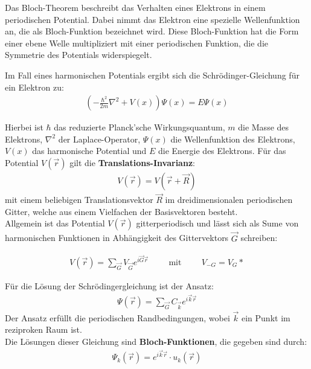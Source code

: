 \label{q:8}

Das Bloch-Theorem beschreibt das Verhalten eines Elektrons in einem periodischen Potential. Dabei nimmt das Elektron eine spezielle Wellenfunktion an, die als Bloch-Funktion bezeichnet wird. Diese Bloch-Funktion hat die Form einer ebene Welle multipliziert mit einer periodischen Funktion, die die Symmetrie des Potentials widerspiegelt.

Im Fall eines harmonischen Potentials ergibt sich die Schrödinger-Gleichung für ein Elektron zu:
\begin{align}
 \left(-\frac{\hbar^2}{2m} \nabla ^2  + V(x)\right) \Psi (x) = E \Psi (x)
\end{align}

Hierbei ist $\hbar$ das reduzierte Planck'sche Wirkungsquantum, $m$ die Masse des Elektrons, $\nabla^2$ der Laplace-Operator, $\Psi (x)$ die Wellenfunktion des Elektrons, $V(x)$ das harmonische Potential und $E$ die Energie des Elektrons.
Für das Potential $V(\vec{r})$ gilt die \textbf{Translations-Invarianz}:
\begin{align}
    V(\vec{r}) = V(\vec{r} + \vec{R})
\end{align}
mit einem beliebigen Translationsvektor $\vec{R}$ im dreidimensionalen periodischen Gitter, welche aus einem Vielfachen der Basisvektoren besteht. \\

Allgemein ist das Potential $V(\vec{r})$ gitterperiodisch und lässt sich als Sume von harmonischen Funktionen in Abhängigkeit des Gittervektors $\vec{G}$ schreiben:

\begin{align}
    V(\vec{r}) = \sum_{\vec{G}} V_{\vec{G}} e^{i \vec{G} \vec{r}} \hspace{1cm} \mbox{mit} \hspace{1cm} V_{-G} = V_G*
\end{align}

Für die Lösung der Schrödingergleichung ist der Ansatz:
\begin{align}
    \Psi(\vec{r}) = \sum_{\vec{G}}  C_{\vec{k}} e^{i \vec{k} \vec{r}}
\end{align}
Der Ansatz erfüllt die periodischen Randbedingungen, wobei $\vec{k}$ ein Punkt im reziproken Raum ist. \\

Die Lösungen dieser Gleichung sind \textbf{Bloch-Funktionen}, die gegeben sind durch:
\begin{align}
    \Psi_k (\vec{r}) = e^{i\vec{k}\vec{r}} \cdot u_k(\vec{r})
\end{align}

